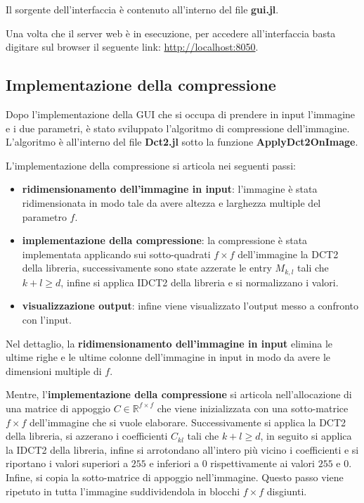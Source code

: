 Il sorgente dell'interfaccia è contenuto all'interno del file \textbf{gui.jl}.

Una volta che il server web è in esecuzione, per accedere all'interfaccia basta 
digitare sul browser il seguente link: \href{http://localhost:8050}{http://localhost:8050}.

\subsection{Implementazione della compressione}
Dopo l'implementazione della GUI che si occupa di prendere in input l'immagine e
i due parametri, è stato sviluppato l'algoritmo di compressione dell'immagine.
L'algoritmo è all'interno del file \textbf{Dct2.jl} sotto la funzione \textbf{ApplyDct2OnImage}.

L'implementazione della compressione si articola nei seguenti passi:
\begin{itemize}
    \item \textbf{ridimensionamento dell'immagine in input}: l'immagine è stata
          ridimensionata in modo tale da avere altezza e larghezza multiple del
          parametro $f$.
    \item \textbf{implementazione della compressione}: la compressione è stata
          implementata applicando sui sotto-quadrati $f\times f$ dell'immagine
          la DCT2 della libreria, successivamente sono state azzerate le entry
          $M_{k,l}$ tali che $k+l\ge d$, infine si applica IDCT2 della libreria e
          si normalizzano i valori.
    \item \textbf{visualizzazione output}: infine viene visualizzato l'output
          messo a confronto con l'input.
\end{itemize}

Nel dettaglio, la \textbf{ridimensionamento dell'immagine in input} elimina le ultime
righe e le ultime colonne dell'immagine in input in modo da avere le dimensioni
multiple di $f$.

Mentre, l'\textbf{implementazione della compressione} si articola nell'allocazione
di una matrice di appoggio $C\in \mathbb{R}^{f\times f}$ che viene inizializzata
con una sotto-matrice $f\times f$ dell'immagine che si vuole elaborare. Successivamente
si applica la DCT2 della libreria, si azzerano i coefficienti $C_{kl}$ tali che
$k+l\ge d$, in seguito si applica la IDCT2 della libreria, infine si arrotondano
all'intero più vicino i coefficienti e si riportano i valori superiori a $255$
e inferiori a $0$ rispettivamente ai valori $255$ e $0$. Infine, si copia la sotto-matrice di
appoggio nell'immagine. Questo passo viene ripetuto in tutta l'immagine suddividendola
in blocchi $f\times f$ disgiunti.